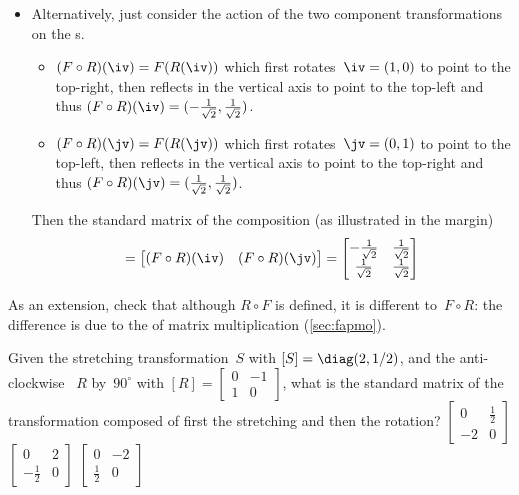 \begin{example}
\begin{solution}
\begin{itemize}
\item Alternatively, just consider the action of the two component transformations on the s.
\begin{itemize}
\item \((F\circ R)(\iv)=F(R(\iv))\) which first rotates~\(\iv=(1,0)\) to point to the top-right, then reflects in the vertical axis to point to the top-left and thus \((F\circ R)(\iv)=(-\rt,\rt)\).
\item \((F\circ R)(\jv)=F(R(\jv))\) which first rotates~\(\jv=(0,1)\) to point to the top-left, then reflects in the vertical axis to point to the top-right and thus \((F\circ R)(\jv)=(\rt,\rt)\).
\end{itemize}
Then the standard matrix of the composition (as illustrated in the margin)
%
\begin{equation*}
[F\circ R]=\begin{bmatrix}(F\circ R)(\iv)&(F\circ R)(\jv)  \end{bmatrix}
=\begin{bmatrix} -\rt&\rt\\\rt&\rt \end{bmatrix}
\end{equation*}
\end{itemize}
\end{solution}
As an extension, check that although \(R\circ F\) is defined, it is 
different to~\(F\circ R\): the difference is due to the  of matrix multiplication (\cref{sec:fapmo}).
\end{example}



\begin{activity}
Given the stretching transformation~\(S\) with  \([S]=\diag(2,1/2)\), and the anti-clockwise ~\(R\) by~\(90^\circ\) with  \([R]=\begin{bmatrix} 0&-1\\1&0 \end{bmatrix}\), what is the standard matrix of the transformation composed of first the stretching and then the rotation?
{\(\begin{bmatrix} 0&\tfrac12\\-2&0 \end{bmatrix}\)}
{\(\begin{bmatrix} 0&2\\-\tfrac12&0 \end{bmatrix}\)}
{\(\begin{bmatrix} 0&-2\\\tfrac12&0 \end{bmatrix}\)}
\end{activity}




